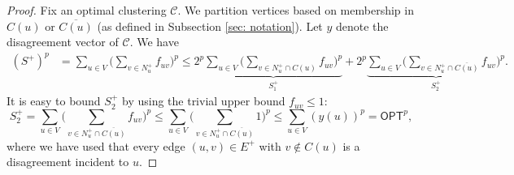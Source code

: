 \begin{proof}
Fix an optimal clustering $\mathcal{C}$. 
We partition vertices based on membership in $C(u)$ or $\overline{C(u)}$ (as defined in Subsection \ref{sec: notation}). Let $y$ denote the disagreement vector of $\mathcal{C}$. We have
\begin{align*}
    (S^+)^p &= \sum_{u \in V} \Big( \sum_{v \in N_u^+} f_{uv}\Big)^p 
    \leq 2^p \underbrace{\sum_{u \in V} \Big(\sum_{v \in N_u^+ \cap C(u)} f_{uv}\Big)^p}_{S_1^+} + 2^p \underbrace{\sum_{u \in V} \Big(\sum_{v \in N_u^+ \cap \overline{C(u)}} f_{uv}\Big)^p}_{S_2^+}.
\end{align*}
 It is easy to bound $S_2^+$ by using the trivial upper bound $f_{uv} \leq 1$:
\[\boxed{S_2^+ = \sum_{u \in V} \Big(\sum_{v \in N_u^+ \cap \overline{C(u)}} f_{uv}\Big)^p \leq \sum_{u \in V} \Big(\sum_{v \in N_u^+ \cap \overline{C(u)}} 1 \Big)^p \leq \sum_{u \in V} (y(u))^p = \textsf{OPT}^p,}\]
where we have used that every edge $(u,v) \in E^+$ with $v \not \in C(u)$ is a disagreement incident to $u$.


\end{proof}
